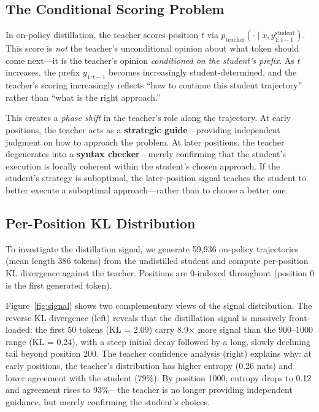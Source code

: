 \documentclass[10pt]{article}
\begin{document}
\subsection{The Conditional Scoring Problem}
\label{sec:conditional}

In on-policy distillation, the teacher scores position $t$ via $p_\text{teacher}(\cdot \mid x, y_{1:t-1}^\text{student})$. This score is \emph{not} the teacher's unconditional opinion about what token should come next---it is the teacher's opinion \emph{conditioned on the student's prefix}. As $t$ increases, the prefix $y_{1:t-1}$ becomes increasingly student-determined, and the teacher's scoring increasingly reflects ``how to continue this student trajectory'' rather than ``what is the right approach.''

This creates a \emph{phase shift} in the teacher's role along the trajectory. At early positions, the teacher acts as a \textbf{strategic guide}---providing independent judgment on how to approach the problem. At later positions, the teacher degenerates into a \textbf{syntax checker}---merely confirming that the student's execution is locally coherent within the student's chosen approach. If the student's strategy is suboptimal, the later-position signal teaches the student to better execute a suboptimal approach---rather than to choose a better one.


\subsection{Per-Position KL Distribution}
\label{sec:kl_distribution}

To investigate the distillation signal, we generate 59,936 on-policy trajectories (mean length 386 tokens) from the undistilled student and compute per-position KL divergence against the teacher. Positions are 0-indexed throughout (position 0 is the first generated token).

Figure~\ref{fig:signal} shows two complementary views of the signal distribution. The reverse KL divergence (left) reveals that the distillation signal is massively front-loaded: the first 50 tokens (KL = 2.09) carry 8.9$\times$ more signal than the 900--1000 range (KL = 0.24), with a steep initial decay followed by a long, slowly declining tail beyond position 200. The teacher confidence analysis (right) explains why: at early positions, the teacher's distribution has higher entropy (0.26 nats) and lower agreement with the student (79\%). By position 1000, entropy drops to 0.12 and agreement rises to 93\%---the teacher is no longer providing independent guidance, but merely confirming the student's choices.
\end{document}
